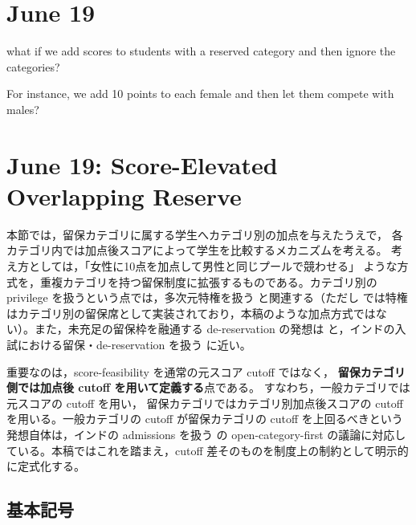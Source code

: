 \documentclass[
  12pt,
  a4paper,
  oneside,
  onecolumn,
  titlepage,
  final
]{jsarticle}
\newcommand{\1}{\mathbf{1}}
\begin{document}






\section{June 19}

what if we add scores to students with a reserved category and then ignore the categories?

For instance, we add 10 points to each female and then let them compete with males?

\section{June 19: Score-Elevated Overlapping Reserve}

本節では，留保カテゴリに属する学生へカテゴリ別の加点を与えたうえで，
各カテゴリ内では加点後スコアによって学生を比較するメカニズムを考える。
考え方としては，「女性に10点を加点して男性と同じプールで競わせる」
ような方式を，重複カテゴリを持つ留保制度に拡張するものである。カテゴリ別の privilege を扱うという点では，多次元特権を扱う \citet{AyBo21a} と関連する（ただし \citet{AyBo21a} では特権はカテゴリ別の留保席として実装されており，本稿のような加点方式ではない）。また，未充足の留保枠を融通する de-reservation の発想は \citet{AyTu20a} と，インドの入試における留保・de-reservation を扱う \citet{AyTu23a} に近い。

重要なのは，score-feasibility を通常の元スコア cutoff ではなく，
\textbf{留保カテゴリ側では加点後 cutoff を用いて定義する}点である。
すなわち，一般カテゴリでは元スコアの cutoff を用い，
留保カテゴリではカテゴリ別加点後スコアの cutoff を用いる。一般カテゴリの cutoff が留保カテゴリの cutoff を上回るべきという発想自体は，インドの admissions を扱う \citet{AyTu23a} の open-category-first の議論に対応している。本稿ではこれを踏まえ，cutoff 差そのものを制度上の制約として明示的に定式化する。

\subsection{基本記号}
\end{document}
